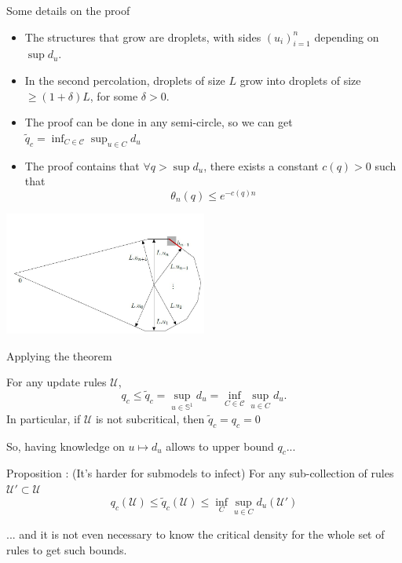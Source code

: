 \begin{frame}{Some details on the proof}
	\begin{itemize}
		\item The structures that grow are droplets, with sides $(u_i)_{i=1}^n$ depending on $\sup d_u$.
		\item In the second percolation, droplets of size $L$ grow into droplets of size $\geq (1+\delta)L$, for some $\delta > 0$.
		\item The proof can be done in any semi-circle, so we can get $\tilde q_c = \inf_{C\in\mathcal{C}}\sup_{u\in C} d_u$
		\item The proof contains that $\forall q> \sup d_u$, there exists a constant $c(q)>0$ such that
			\begin{equation*}
				\theta_n(q) \leq e^{-c(q)n}
			\end{equation*}
	\end{itemize}
	\begin{center}
    	 	\includegraphics[width=0.5\textwidth]{droplet.jpg}
	\end{center}
\end{frame}

\begin{frame}{Applying the theorem}
	\begin{theorem}
		For any update rules $\mathcal{U}$,
		\begin{equation*}
			q_c \leq \tilde q_c = \sup_{u\in\mathbb{S}^1} d_u = \inf_{C\in\mathcal{C}} \sup_{u\in C} d_u.
		\end{equation*}
		In particular, if $\mathcal{U}$ is not subcritical, then $\tilde q_c = q_c = 0$ 
	\end{theorem}
	So, having knowledge on $u\mapsto d_u$ allows to upper bound $q_c$...
	\begin{block}{Proposition : (It's harder for submodels to infect)}
		For any sub-collection of rules $\mathcal{U}'\subset \mathcal{U}$
		\begin{equation*}
			q_c(\mathcal{U}) \leq \tilde q_c (\mathcal{U}) \leq \inf_C \sup_{u\in C} d_u(\mathcal{U'})
		\end{equation*}
	\end{block}
	... and it is not even necessary to know the critical density for the whole set of rules to get such bounds.
\end{frame}

